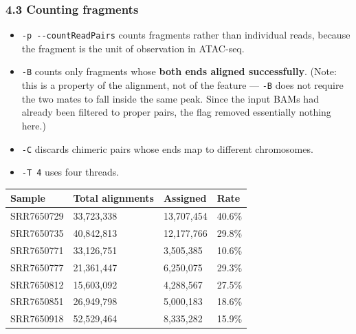 \documentclass[
  11pt,
  a4paper,
]{article}
\newenvironment{Shaded}{}{}
\newcommand{\AttributeTok}[1]{\textcolor[rgb]{0.49,0.56,0.16}{#1}}
\newcommand{\DataTypeTok}[1]{\textcolor[rgb]{0.56,0.13,0.00}{#1}}
\newcommand{\ExtensionTok}[1]{#1}
\newcommand{\NormalTok}[1]{#1}
\newcommand{\OperatorTok}[1]{\textcolor[rgb]{0.40,0.40,0.40}{#1}}
\newcommand{\StringTok}[1]{\textcolor[rgb]{0.25,0.44,0.63}{#1}}
\newcommand{\VariableTok}[1]{\textcolor[rgb]{0.10,0.09,0.49}{#1}}
\providecommand{\tightlist}{%
  \setlength{\itemsep}{0pt}\setlength{\parskip}{0pt}}
\begin{document}
\hypertarget{counting-fragments}{%
\subsubsection{4.3 Counting fragments}\label{counting-fragments}}

\begin{Shaded}
\end{Shaded}

\begin{itemize}
\tightlist
\item
  \texttt{-p\ -\/-countReadPairs} counts fragments rather than
  individual reads, because the fragment is the unit of observation in
  ATAC-seq.
\item
  \texttt{-B} counts only fragments whose \textbf{both ends aligned
  successfully}. (Note: this is a property of the alignment, not of the
  feature --- \texttt{-B} does not require the two mates to fall inside
  the same peak. Since the input BAMs had already been filtered to
  proper pairs, the flag removed essentially nothing here.)
\item
  \texttt{-C} discards chimeric pairs whose ends map to different
  chromosomes.
\item
  \texttt{-T\ 4} uses four threads.
\end{itemize}

\begin{longtable}[]{@{}llll@{}}
\toprule\noalign{}
Sample & Total alignments & Assigned & Rate \\
\midrule\noalign{}
\endhead
\bottomrule\noalign{}
\endlastfoot
SRR7650729 & 33,723,338 & 13,707,454 & 40.6\% \\
SRR7650735 & 40,842,813 & 12,177,766 & 29.8\% \\
SRR7650771 & 33,126,751 & 3,505,385 & 10.6\% \\
SRR7650777 & 21,361,447 & 6,250,075 & 29.3\% \\
SRR7650812 & 15,603,092 & 4,288,567 & 27.5\% \\
SRR7650851 & 26,949,798 & 5,000,183 & 18.6\% \\
SRR7650918 & 52,529,464 & 8,335,282 & 15.9\% \\
\end{longtable}
\end{document}

